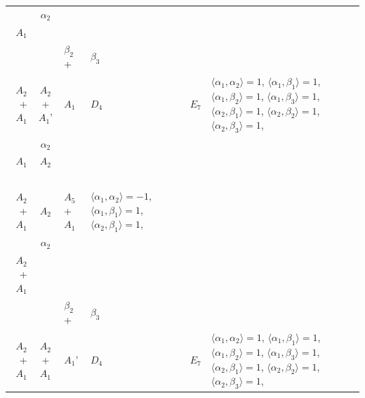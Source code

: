 \documentclass[12pt]{report}
\begin{document}
\begin{appendix}
{\begin{longtable}{rcl p{1cm}p{1cm}p{3cm} }
\begin{tabular}{cc}$\alpha_1$+ & $\alpha_2$\\\tiny{ $A_1$ } & \tiny{  }\end{tabular} &\begin{tabular}{c} = \\~ \end{tabular} & \begin{tabular}{ccc}$\beta_1$+ & $\beta_2$+ & $\beta_3$\\\tiny{ $A_2$+$A_1$ } & \tiny{ $A_2$+$A_1$' } & \tiny{ $A_1$ }\end{tabular} & $D_4$ & $E_7$ & $\langle\alpha_1, \alpha_2\rangle=1$,  $\langle\alpha_1, \beta_1\rangle=1$, $\langle\alpha_1, \beta_2\rangle=1$, $\langle\alpha_1, \beta_3\rangle=1$, $\langle\alpha_2, \beta_1\rangle=1$, $\langle\alpha_2, \beta_2\rangle=1$, $\langle\alpha_2, \beta_3\rangle=1$, 
\\
\begin{tabular}{cc}$\alpha_1$+ & $\alpha_2$\\\tiny{ $A_1$ } & \tiny{ $A_2$ }\end{tabular} &\begin{tabular}{c} = \\~ \end{tabular} & \begin{tabular}{c}$\beta_1$\\\tiny{ $A_2$+$A_1$ }\end{tabular} & $A_2$ & $A_5$+$A_1$ & $\langle\alpha_1, \alpha_2\rangle=-1$,  $\langle\alpha_1, \beta_1\rangle=1$, $\langle\alpha_2, \beta_1\rangle=1$, 
\\
\begin{tabular}{cc}$\alpha_1$+ & $\alpha_2$\\\tiny{ $A_2$+$A_1$ } & \tiny{  }\end{tabular} &\begin{tabular}{c} = \\~ \end{tabular} & \begin{tabular}{ccc}$\beta_1$+ & $\beta_2$+ & $\beta_3$\\\tiny{ $A_2$+$A_1$ } & \tiny{ $A_2$+$A_1$ } & \tiny{ $A_1$' }\end{tabular} & $D_4$ & $E_7$ & $\langle\alpha_1, \alpha_2\rangle=1$,  $\langle\alpha_1, \beta_1\rangle=1$, $\langle\alpha_1, \beta_2\rangle=1$, $\langle\alpha_1, \beta_3\rangle=1$, $\langle\alpha_2, \beta_1\rangle=1$, $\langle\alpha_2, \beta_2\rangle=1$, $\langle\alpha_2, \beta_3\rangle=1$, 
\\

\end{longtable}}
\end{appendix}
\end{document}
